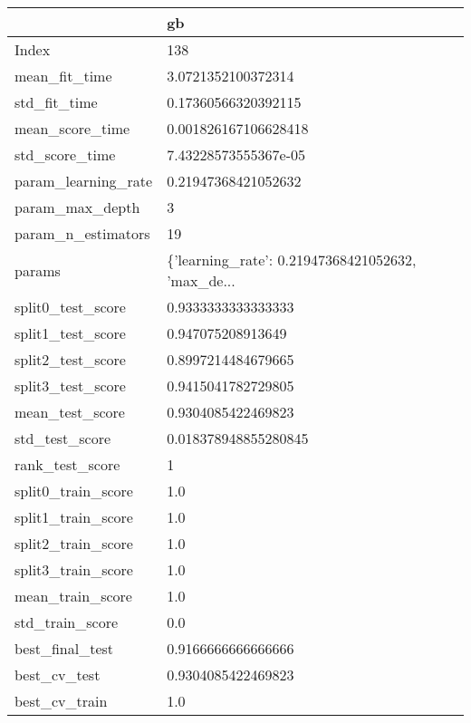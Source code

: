 \begin{tabular}{ll}
\toprule
{} &                                                 gb \\
\midrule
Index               &                                                138 \\
mean\_fit\_time       &                                 3.0721352100372314 \\
std\_fit\_time        &                                0.17360566320392115 \\
mean\_score\_time     &                               0.001826167106628418 \\
std\_score\_time      &                               7.43228573555367e-05 \\
param\_learning\_rate &                                0.21947368421052632 \\
param\_max\_depth     &                                                  3 \\
param\_n\_estimators  &                                                 19 \\
params              &  \{'learning\_rate': 0.21947368421052632, 'max\_de... \\
split0\_test\_score   &                                 0.9333333333333333 \\
split1\_test\_score   &                                  0.947075208913649 \\
split2\_test\_score   &                                 0.8997214484679665 \\
split3\_test\_score   &                                 0.9415041782729805 \\
mean\_test\_score     &                                 0.9304085422469823 \\
std\_test\_score      &                               0.018378948855280845 \\
rank\_test\_score     &                                                  1 \\
split0\_train\_score  &                                                1.0 \\
split1\_train\_score  &                                                1.0 \\
split2\_train\_score  &                                                1.0 \\
split3\_train\_score  &                                                1.0 \\
mean\_train\_score    &                                                1.0 \\
std\_train\_score     &                                                0.0 \\
best\_final\_test     &                                 0.9166666666666666 \\
best\_cv\_test        &                                 0.9304085422469823 \\
best\_cv\_train       &                                                1.0 \\
\bottomrule
\end{tabular}
